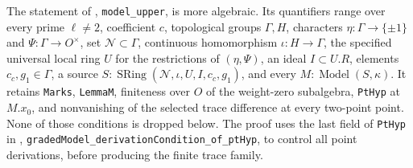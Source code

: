 The statement of
, \texttt{model\_upper},
is more algebraic.  Its quantifiers range over every prime
$\ell\ne2$, coefficient $c$, topological groups $\Gamma,H$,
characters $\eta:\Gamma\to\{\pm1\}$ and
$\Psi:\Gamma\to O^\times$, set $\mathcal N\subset\Gamma$,
continuous homomorphism $\iota:H\to\Gamma$, the specified universal
local ring $U$ for the restrictions of $(\eta,\Psi)$, an ideal
$I\subset U.R$, elements $c_c,g_1\in\Gamma$, a source
$S:\operatorname{SRing}(\mathcal N,\iota,U,I,c_c,g_1)$, and every
$M:\operatorname{Model}(S,\kappa)$.
It retains \texttt{Marks}, \texttt{LemmaM}, finiteness over $O$
of the weight-zero subalgebra, \texttt{PtHyp} at $M.x_0$, and
nonvanishing of the selected trace difference at every two-point
point.  None of those conditions is dropped below.
The proof uses the last field of \texttt{PtHyp} in
,
\texttt{gradedModel\_derivationCondition\_of\_ptHyp}, to control
all point derivations, before producing the finite trace family.

